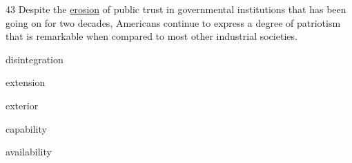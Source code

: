 \begin{question}{43}
Despite the \uline{erosion} of public trust in governmental institutions that has been going on for two decades, Americans continue to express a degree of patriotism that is remarkable when compared to most other industrial societies.
\begin{choices}
  \item disintegration
  \item extension
  \item exterior
  \item capability
  \item availability
\end{choices}
\end{question}
